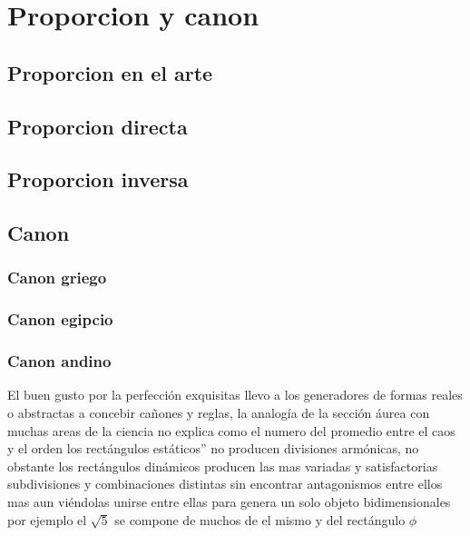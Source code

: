 

\chapter{Proporcion y canon}


\section{Proporcion en el arte}
\section{Proporcion directa}
\section{Proporcion inversa}
\section{Canon}

\subsection{Canon griego}
\subsection{Canon egipcio}
\subsection{Canon andino}
El buen gusto por la perfección exquisitas llevo a los generadores de formas reales o abstractas a concebir cañones y reglas, la analogía de la sección áurea con muchas areas de la ciencia no explica como el numero del promedio entre el caos y el orden los rectángulos estáticos'' no producen divisiones armónicas, no obstante los rectángulos dinámicos producen las mas variadas y satisfactorias subdivisiones  y combinaciones distintas sin encontrar antagonismos entre ellos mas aun viéndolas unirse entre ellas para genera un solo objeto bidimensionales  por ejemplo el $\sqrt{5}$ se compone de muchos de el mismo y del rectángulo $\phi$
















